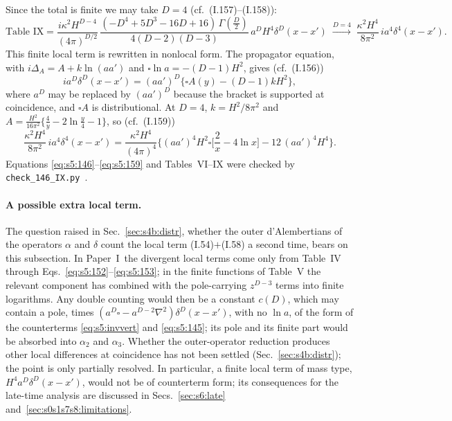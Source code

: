 \documentclass[aps,prd,onecolumn,10pt,nofootinbib,floatfix]{revtex4-2}
\newcommand{\PI}{Paper~I}
\newcommand{\eqI}[1]{(I.#1)}
\begin{document}
Since the total is finite we may take $D=4$ (cf.\ \eqI{157}--\eqI{158}):
\begin{equation}
\text{Table IX}=\frac{i\kappa^2H^{D-4}}{(4\pi)^{D/2}}\,\frac{(-D^4+5D^3-16D+16)\,\Gamma(\frac D2)}{4(D-2)(D-3)}\,a^DH^4\delta^D(x-x')
\;\xrightarrow{D=4}\;\frac{\kappa^2H^4}{8\pi^2}\,ia^4\delta^4(x-x') .
\label{eq:s5:157}
\end{equation}
This finite local term is rewritten in nonlocal form.
The propagator equation, with $i\Delta_A=A+k\ln(aa')$ and $\square\ln a=-(D-1)H^2$, gives (cf.\ \eqI{156})
\begin{equation}
ia^D\delta^D(x-x')=(aa')^D\big\{\square A(y)-(D-1)kH^2\big\},
\label{eq:s5:156}
\end{equation}
where $a^D$ may be replaced by $(aa')^D$ because the bracket is supported at coincidence, and $\square A$ is distributional.
At $D=4$, $k=H^2/8\pi^2$ and $A=\frac{H^2}{16\pi^2}\{\frac4y-2\ln\frac y4-1\}$, so (cf.\ \eqI{159})
\begin{equation}
\frac{\kappa^2H^4}{8\pi^2}\,ia^4\delta^4(x-x')=\frac{\kappa^2H^4}{(4\pi)^4}\Big\{(aa')^4H^2\square\Big[\frac2x-4\ln x\Big]-12\,(aa')^4H^4\Big\}.
\label{eq:s5:159}
\end{equation}
Equations \eqref{eq:s5:146}--\eqref{eq:s5:159} and Tables~VI--IX were checked by \texttt{check\_146\_IX.py}~\cite{ref:repo}.

\paragraph*{A possible extra local term.}
The question raised in Sec.~\ref{sec:s4b:distr}, whether the outer d'Alembertians of the operators $\alpha$ and $\delta$ count the local term \eqI{54}$+$\eqI{58} a second time, bears on this subsection.
In \PI\ the divergent local terms come only from Table~IV through Eqs.~\eqref{eq:s5:152}--\eqref{eq:s5:153}; in the finite functions of Table~V the relevant component has combined with the pole-carrying $z^{D-3}$ terms into finite logarithms.
Any double counting would then be a constant $c(D)$, which may contain a pole, times $(a^D\square-a^{D-2}\nabla^2)\delta^D(x-x')$, with no $\ln a$, of the form of the counterterms \eqref{eq:s5:invvert} and \eqref{eq:s5:145}; its pole and its finite part would be absorbed into $\alpha_2$ and $\alpha_3$.
Whether the outer-operator reduction produces other local differences at coincidence has not been settled (Sec.~\ref{sec:s4b:distr}); the point is only partially resolved.
In particular, a finite local term of mass type, $H^4a^D\delta^D(x-x')$, would not be of counterterm form; its consequences for the late-time analysis are discussed in Secs.~\ref{sec:s6:late} and~\ref{sec:s0s1s7s8:limitations}.
\end{document}

